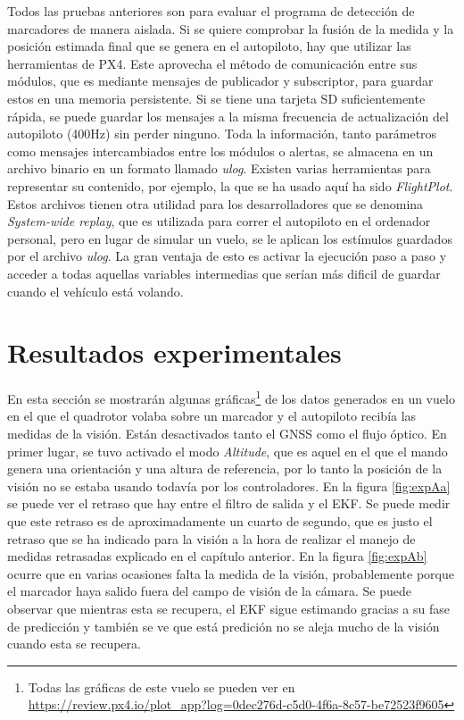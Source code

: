 Todos las pruebas anteriores son para evaluar el programa de detección de marcadores de manera aislada. Si se quiere comprobar la fusión de la medida y la posición estimada final que se genera en el autopiloto, hay que utilizar las herramientas de PX4. Este aprovecha el método de comunicación entre sus módulos, que es mediante mensajes de publicador y subscriptor, para guardar estos en una memoria persistente. Si se tiene una tarjeta SD suficientemente rápida, se puede guardar los mensajes a la misma frecuencia de actualización del autopiloto (400Hz) sin perder ninguno. 
Toda la información, tanto parámetros como mensajes intercambiados entre los módulos o alertas, se almacena en un archivo binario en un formato llamado \textit{ulog}. Existen varias herramientas para representar su contenido, por ejemplo, la que se ha usado aquí ha sido \textit{FlightPlot}. Estos archivos tienen otra utilidad para los desarrolladores que se denomina \textit{System-wide replay}, que es utilizada para correr el autopiloto en el ordenador personal, pero en lugar de simular un vuelo, se le aplican los estímulos guardados por el archivo \textit{ulog}. La gran ventaja de esto es activar la ejecución paso a paso y acceder a todas aquellas variables intermedias que serían más dificil de guardar cuando el vehículo está volando.


\section{Resultados experimentales}
En esta sección se mostrarán algunas gráficas\footnote{Todas las gráficas de este vuelo se pueden ver en \url{https://review.px4.io/plot\_app?log=0dec276d-c5d0-4f6a-8c57-be72523f9605}} de los datos generados en un vuelo en el que el quadrotor volaba sobre un marcador y el autopiloto recibía las medidas de la visión. Están desactivados tanto el GNSS como el flujo óptico. 
En primer lugar, se tuvo activado el modo \textit{Altitude}, que es aquel en el que el mando genera una orientación y una altura de referencia, por lo tanto la posición de la visión no se estaba usando todavía por los controladores. En la figura \ref{fig:expAa} se puede ver el retraso que hay entre el filtro de salida y el EKF. Se puede medir que este retraso es de aproximadamente un cuarto de segundo, que es justo el retraso que se ha indicado para la visión a la hora de realizar el manejo de medidas retrasadas explicado en el capítulo anterior. En la figura \ref{fig:expAb} ocurre que en varias ocasiones falta la medida de la visión, probablemente porque el marcador haya salido fuera del campo de visión de la cámara. Se puede observar que mientras esta se recupera, el EKF sigue estimando gracias a su fase de predicción y también se ve que está predición no se aleja mucho de la visión cuando esta se recupera.

